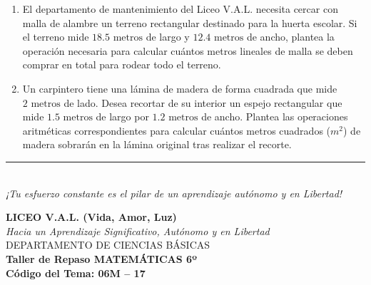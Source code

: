 \documentclass[12pt, letterpaper]{article}
\begin{document}
\begin{enumerate}[itemsep=0.7cm]
		\item El departamento de mantenimiento del Liceo V.A.L. necesita cercar con malla de alambre un terreno rectangular destinado para la huerta escolar. Si el terreno mide $18.5\text{ metros}$ de largo y $12.4\text{ metros}$ de ancho, plantea la operación necesaria para calcular cuántos metros lineales de malla se deben comprar en total para rodear todo el terreno.
		
		\item Un carpintero tiene una lámina de madera de forma cuadrada que mide $2\text{ metros}$ de lado. Desea recortar de su interior un espejo rectangular que mide $1.5\text{ metros}$ de largo por $1.2\text{ metros}$ de ancho. Plantea las operaciones aritméticas correspondientes para calcular cuántos metros cuadrados ($m^2$) de madera sobrarán en la lámina original tras realizar el recorte.
		
	\end{enumerate}
	
	\vfill
	\begin{center}
		\rule{0.5\textwidth}{0.4pt} \\
		\vspace{0.2cm}
		\textit{¡Tu esfuerzo constante es el pilar de un aprendizaje autónomo y en Libertad!}
	\end{center}
	\newpage
	\begin{center}
		{\Large \textbf{LICEO V.A.L. (Vida, Amor, Luz)}}\\[0.1cm]
		{\normalsize \textit{Hacia un Aprendizaje Significativo, Autónomo y en Libertad}}\\[0.2cm]
		{\large DEPARTAMENTO DE CIENCIAS BÁSICAS}\\[0.1cm]
		\textbf{Taller de Repaso MATEMÁTICAS 6º}\\[0.1cm]
		\textbf{Código del Tema: 06M – 17}\\[0.1cm]
	\end{center}
	
\end{document}
